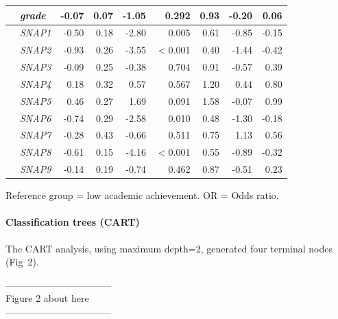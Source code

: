 \documentclass[10pt,letterpaper]{article}
\begin{document}
{{\begin{table}[H]
\begin{tabular}{|llrrrr|rrr|}
 \hline
 &  {\it grade} & -0.07 & 0.07 & -1.05 & 0.292 & 0.93 &  -0.20 & 0.06  \\ 
 \hline
  &  {\it SNAP1} & -0.50 & 0.18 & -2.80 & 0.005 & 0.61 &  -0.85 & -0.15  \\ 
  \hline
  &  {\it SNAP2} & -0.93 & 0.26 & -3.55 & $<$0.001 & 0.40 &  -1.44 & -0.42  \\ 
  \hline
  &  {\it SNAP3} & -0.09 & 0.25 & -0.38 & 0.704 & 0.91 &  -0.57 & 0.39  \\ 
  \hline
  &  {\it SNAP4} & 0.18 & 0.32 & 0.57& 0.567 & 1.20 &  0.44 & 0.80 \\ 
  \hline
  &  {\it SNAP5} & 0.46 & 0.27 & 1.69 & 0.091 & 1.58 &  -0.07 & 0.99  \\ 
  \hline 
  &  {\it SNAP6} & -0.74 & 0.29 & -2.58 & 0.010 & 0.48 &  -1.30 & -0.18  \\ 
   \hline
  &  {\it SNAP7} & -0.28 & 0.43 & -0.66 & 0.511 & 0.75 &   1.13 & 0.56  \\ 
  \hline
  &  {\it SNAP8} & -0.61 & 0.15 & -4.16 & $<$0.001 & 0.55 &  -0.89 & -0.32  \\ 
  \hline
  &  {\it SNAP9} & -0.14 & 0.19 & -0.74 & 0.462 & 0.87 &  -0.51 & 0.23  \\ 
   \hline

\end{tabular}
\begin{center}
Reference group = low academic achievement. OR = Odds ratio.\\ 
\end{center}
\end{table}

  
\paragraph{Classification trees (CART)}

 The CART analysis, using  maximum depth=$2$,  generated four terminal nodes (Fig~2). 
 
\vspace{2mm}
 
\begin{center}
---------------------------------\\
 
 Figure 2 about here \\
 
---------------------------------\\
\end{center}
  
\vspace{2mm}
  
}}
\end{document}
